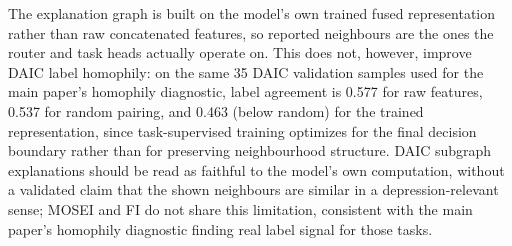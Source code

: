\documentclass[letterpaper]{article}
\begin{document}
The explanation graph is built on the model's own trained fused representation rather than raw concatenated features, so reported neighbours are the ones the router and task heads actually operate on. This does not, however, improve DAIC label homophily: on the same 35 DAIC validation samples used for the main paper's homophily diagnostic, label agreement is 0.577 for raw features, 0.537 for random pairing, and 0.463 (below random) for the trained representation, since task-supervised training optimizes for the final decision boundary rather than for preserving neighbourhood structure. DAIC subgraph explanations should be read as faithful to the model's own computation, without a validated claim that the shown neighbours are similar in a depression-relevant sense; MOSEI and FI do not share this limitation, consistent with the main paper's homophily diagnostic finding real label signal for those tasks.





\end{document}
